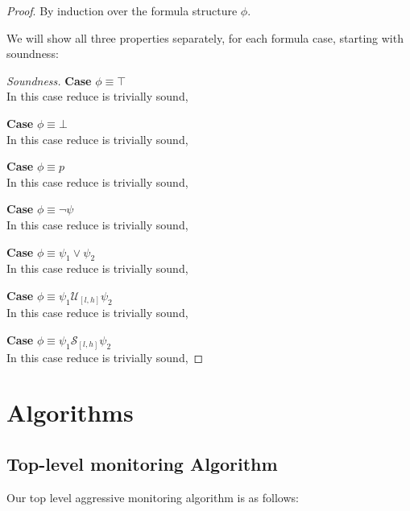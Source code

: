 \documentclass[10pt,a4paper]{article}
\begin{document}
\noindent \emph{Proof}. By induction over the formula structure $\phi$.

We will show all three properties separately, for each formula case, starting with soundness:

\begin{proof}[Soundness]

\noindent \textbf{Case} $\phi \equiv \top$ \\
In this case reduce is trivially sound, 

\noindent \textbf{Case} $\phi \equiv \bot$ \\
In this case reduce is trivially sound, 

\noindent \textbf{Case} $\phi \equiv p$ \\
In this case reduce is trivially sound, 

\noindent \textbf{Case} $\phi \equiv \neg \psi$ \\
In this case reduce is trivially sound, 

\noindent \textbf{Case} $\phi \equiv \psi_1 \vee \psi_2$ \\
In this case reduce is trivially sound, 

\noindent \textbf{Case} $\phi \equiv \psi_1 \mathcal{U}_{[l,h]} \psi_2$ \\
In this case reduce is trivially sound, 

\noindent \textbf{Case} $\phi \equiv \psi_1 \mathcal{S}_{[l,h]} \psi_2$ \\
In this case reduce is trivially sound, 
\end{proof}

\pagebreak
\section{Algorithms}
\subsection{Top-level monitoring Algorithm}
Our top level aggressive monitoring algorithm is as follows:
\end{document}
